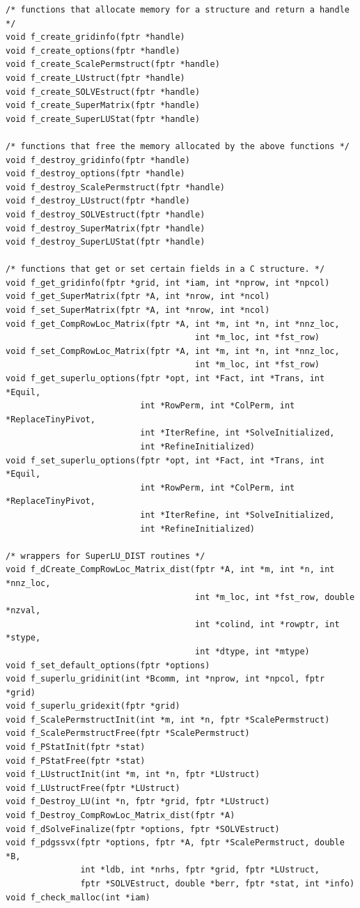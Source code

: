\begin{verbatim}
/* functions that allocate memory for a structure and return a handle */
void f_create_gridinfo(fptr *handle)
void f_create_options(fptr *handle)
void f_create_ScalePermstruct(fptr *handle)
void f_create_LUstruct(fptr *handle)
void f_create_SOLVEstruct(fptr *handle)
void f_create_SuperMatrix(fptr *handle)
void f_create_SuperLUStat(fptr *handle)

/* functions that free the memory allocated by the above functions */
void f_destroy_gridinfo(fptr *handle)
void f_destroy_options(fptr *handle)
void f_destroy_ScalePermstruct(fptr *handle)
void f_destroy_LUstruct(fptr *handle)
void f_destroy_SOLVEstruct(fptr *handle)
void f_destroy_SuperMatrix(fptr *handle)
void f_destroy_SuperLUStat(fptr *handle)

/* functions that get or set certain fields in a C structure. */
void f_get_gridinfo(fptr *grid, int *iam, int *nprow, int *npcol)
void f_get_SuperMatrix(fptr *A, int *nrow, int *ncol)
void f_set_SuperMatrix(fptr *A, int *nrow, int *ncol)
void f_get_CompRowLoc_Matrix(fptr *A, int *m, int *n, int *nnz_loc,
                                      int *m_loc, int *fst_row)
void f_set_CompRowLoc_Matrix(fptr *A, int *m, int *n, int *nnz_loc,
                                      int *m_loc, int *fst_row)
void f_get_superlu_options(fptr *opt, int *Fact, int *Trans, int *Equil,
                           int *RowPerm, int *ColPerm, int *ReplaceTinyPivot,
                           int *IterRefine, int *SolveInitialized,
                           int *RefineInitialized)
void f_set_superlu_options(fptr *opt, int *Fact, int *Trans, int *Equil,
                           int *RowPerm, int *ColPerm, int *ReplaceTinyPivot,
                           int *IterRefine, int *SolveInitialized,
                           int *RefineInitialized)

/* wrappers for SuperLU_DIST routines */
void f_dCreate_CompRowLoc_Matrix_dist(fptr *A, int *m, int *n, int *nnz_loc,
                                      int *m_loc, int *fst_row, double *nzval,
                                      int *colind, int *rowptr, int *stype,
                                      int *dtype, int *mtype)
void f_set_default_options(fptr *options)
void f_superlu_gridinit(int *Bcomm, int *nprow, int *npcol, fptr *grid)
void f_superlu_gridexit(fptr *grid)
void f_ScalePermstructInit(int *m, int *n, fptr *ScalePermstruct)
void f_ScalePermstructFree(fptr *ScalePermstruct)
void f_PStatInit(fptr *stat)
void f_PStatFree(fptr *stat)
void f_LUstructInit(int *m, int *n, fptr *LUstruct)
void f_LUstructFree(fptr *LUstruct)
void f_Destroy_LU(int *n, fptr *grid, fptr *LUstruct)
void f_Destroy_CompRowLoc_Matrix_dist(fptr *A)
void f_dSolveFinalize(fptr *options, fptr *SOLVEstruct)
void f_pdgssvx(fptr *options, fptr *A, fptr *ScalePermstruct, double *B,
               int *ldb, int *nrhs, fptr *grid, fptr *LUstruct,
               fptr *SOLVEstruct, double *berr, fptr *stat, int *info)
void f_check_malloc(int *iam)
\end{verbatim}

\medskip


